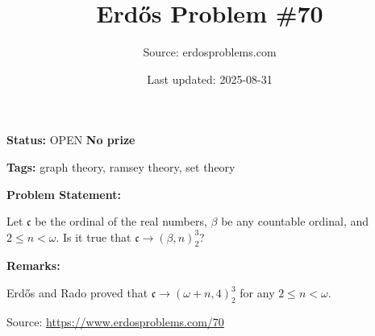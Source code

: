 \documentclass{article}
\title{Erd\H{o}s Problem \#70}
\date{Last updated: 2025-08-31}
\author{Source: erdosproblems.com}
\begin{document}
\maketitle

\noindent\textbf{Status:} OPEN \quad \textbf{No prize}

\noindent\textbf{Tags:} graph theory, ramsey theory, set theory

\medskip
\noindent\textbf{Problem Statement:}

Let $\mathfrak{c}$ be the ordinal of the real numbers, $\beta$ be any countable ordinal, and $2\leq n<\omega$. Is it true that $\mathfrak{c}\to (\beta, n)_2^3$?

\bigskip
\noindent\textbf{Remarks:}

Erd\H{o}s and Rado proved that $\mathfrak{c}\to (\omega+n,4)_2^3$ for any $2\leq n<\omega$.

\bigskip
\noindent\small{Source: \url{https://www.erdosproblems.com/70}}
\end{document}
